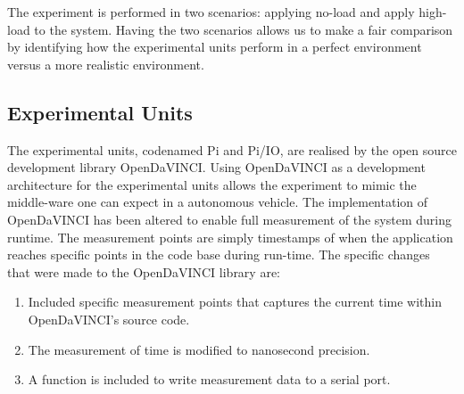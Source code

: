 The experiment is performed in two scenarios: applying no-load and apply high-load to the system. Having the two scenarios allows us to make a fair comparison by identifying how the experimental units perform in a perfect environment versus a more realistic environment.  




\subsection{Experimental Units}
\label{section:exp-units}

The experimental units, codenamed Pi and Pi/IO, are realised by the open source development library OpenDaVINCI. Using OpenDaVINCI as a development architecture for the experimental units allows the experiment to mimic the middle-ware one can expect in a autonomous vehicle. The implementation of OpenDaVINCI has been altered to enable full measurement of the system during runtime. The measurement points are simply timestamps of when the application reaches specific points in the code base during run-time. The specific changes that were made to the OpenDaVINCI library are: \\

\begin{enumerate}
\item Included specific measurement points that captures the current time within OpenDaVINCI's source code.
\item The measurement of time is modified to nanosecond precision.
\item A function is included to write measurement data to a serial port.\\
\end{enumerate}

